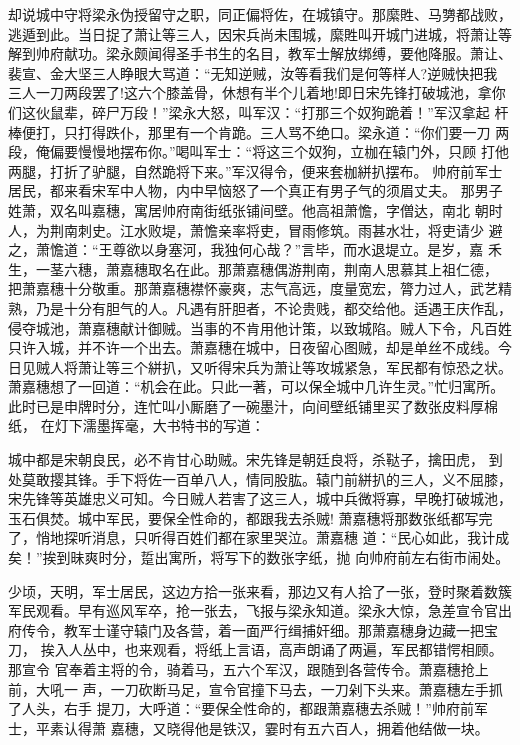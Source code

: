 却说城中守将梁永伪授留守之职，同正偏将佐，在城镇守。那縻貹、马勥都战败，
逃遁到此。当日捉了萧让等三人，因宋兵尚未围城，縻貹叫开城门进城，将萧让等
解到帅府献功。梁永颇闻得圣手书生的名目，教军士解放绑缚，要他降服。萧让、
裴宣、金大坚三人睁眼大骂道：“无知逆贼，汝等看我们是何等样人?逆贼快把我
三人一刀两段罢了!这六个膝盖骨，休想有半个儿着地!即日宋先锋打破城池，拿你
们这伙鼠辈，碎尸万段！”梁永大怒，叫军汉：“打那三个奴狗跪着！”军汉拿起
杆棒便打，只打得跌仆，那里有一个肯跪。三人骂不绝口。梁永道：“你们要一刀
两段，俺偏要慢慢地摆布你。”喝叫军士：“将这三个奴狗，立枷在辕门外，只顾
打他两腿，打折了驴腿，自然跪将下来。”军汉得令，便来套枷絣扒摆布。
帅府前军士居民，都来看宋军中人物，内中早恼怒了一个真正有男子气的须眉丈夫。
那男子姓萧，双名叫嘉穗，寓居帅府南街纸张铺间壁。他高祖萧憺，字僧达，南北
朝时人，为荆南刺史。江水败堤，萧憺亲率将吏，冒雨修筑。雨甚水壮，将吏请少
避之，萧憺道：“王尊欲以身塞河，我独何心哉？”言毕，而水退堤立。是岁，嘉
禾生，一茎六穗，萧嘉穗取名在此。那萧嘉穗偶游荆南，荆南人思慕其上祖仁德，
把萧嘉穗十分敬重。那萧嘉穗襟怀豪爽，志气高远，度量宽宏，膂力过人，武艺精
熟，乃是十分有胆气的人。凡遇有肝胆者，不论贵贱，都交给他。适遇王庆作乱，
侵夺城池，萧嘉穗献计御贼。当事的不肯用他计策，以致城陷。贼人下令，凡百姓
只许入城，并不许一个出去。萧嘉穗在城中，日夜留心图贼，却是单丝不成线。今
日见贼人将萧让等三个絣扒，又听得宋兵为萧让等攻城紧急，军民都有惊恐之状。
萧嘉穗想了一回道：“机会在此。只此一著，可以保全城中几许生灵。”忙归寓所。
此时已是申牌时分，连忙叫小厮磨了一碗墨汁，向间壁纸铺里买了数张皮料厚棉纸，
在灯下濡墨挥毫，大书特书的写道：

城中都是宋朝良民，必不肯甘心助贼。宋先锋是朝廷良将，杀鞑子，擒田虎，
到处莫敢撄其锋。手下将佐一百单八人，情同股肱。辕门前絣扒的三人，义不屈膝，
宋先锋等英雄忠义可知。今日贼人若害了这三人，城中兵微将寡，早晚打破城池，
玉石俱焚。城中军民，要保全性命的，都跟我去杀贼!
萧嘉穗将那数张纸都写完了，悄地探听消息，只听得百姓们都在家里哭泣。萧嘉穗
道：“民心如此，我计成矣！”挨到昧爽时分，踅出寓所，将写下的数张字纸，抛
向帅府前左右街市闹处。

少顷，天明，军士居民，这边方拾一张来看，那边又有人拾了一张，登时聚着数簇
军民观看。早有巡风军卒，抢一张去，飞报与梁永知道。梁永大惊，急差宣令官出
府传令，教军士谨守辕门及各营，着一面严行缉捕奸细。那萧嘉穗身边藏一把宝刀，
挨入人丛中，也来观看，将纸上言语，高声朗诵了两遍，军民都错愕相顾。那宣令
官奉着主将的令，骑着马，五六个军汉，跟随到各营传令。萧嘉穗抢上前，大吼一
声，一刀砍断马足，宣令官撞下马去，一刀剁下头来。萧嘉穗左手抓了人头，右手
提刀，大呼道：“要保全性命的，都跟萧嘉穗去杀贼！”帅府前军士，平素认得萧
嘉穗，又晓得他是铁汉，霎时有五六百人，拥着他结做一块。


